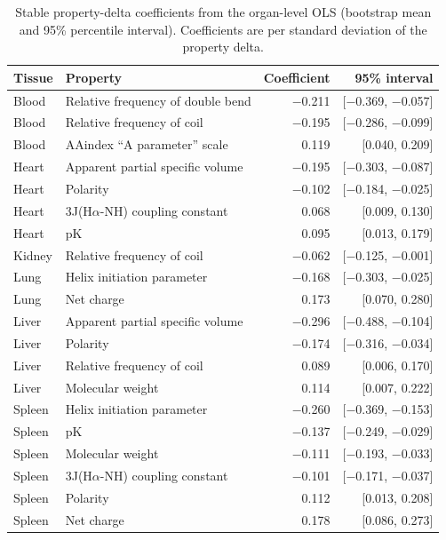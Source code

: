 \documentclass[11pt]{article}
\begin{document}
\begin{table}[H]
\centering
\caption{Stable property-delta coefficients from the organ-level OLS (bootstrap mean and 95\%
percentile interval). Coefficients are per standard deviation of the property delta.}
\label{tab:prop}
\small
\begin{tabular}{llrr}
\toprule
Tissue & Property & Coefficient & 95\% interval \\
\midrule
Blood & Relative frequency of double bend & $-$0.211 & [$-$0.369, $-$0.057] \\
Blood & Relative frequency of coil & $-$0.195 & [$-$0.286, $-$0.099] \\
Blood & AAindex ``A parameter'' scale & 0.119 & [0.040, 0.209] \\
Heart & Apparent partial specific volume & $-$0.195 & [$-$0.303, $-$0.087] \\
Heart & Polarity & $-$0.102 & [$-$0.184, $-$0.025] \\
Heart & 3J(H$\alpha$-NH) coupling constant & 0.068 & [0.009, 0.130] \\
Heart & pK & 0.095 & [0.013, 0.179] \\
Kidney & Relative frequency of coil & $-$0.062 & [$-$0.125, $-$0.001] \\
Lung & Helix initiation parameter & $-$0.168 & [$-$0.303, $-$0.025] \\
Lung & Net charge & 0.173 & [0.070, 0.280] \\
Liver & Apparent partial specific volume & $-$0.296 & [$-$0.488, $-$0.104] \\
Liver & Polarity & $-$0.174 & [$-$0.316, $-$0.034] \\
Liver & Relative frequency of coil & 0.089 & [0.006, 0.170] \\
Liver & Molecular weight & 0.114 & [0.007, 0.222] \\
Spleen & Helix initiation parameter & $-$0.260 & [$-$0.369, $-$0.153] \\
Spleen & pK & $-$0.137 & [$-$0.249, $-$0.029] \\
Spleen & Molecular weight & $-$0.111 & [$-$0.193, $-$0.033] \\
Spleen & 3J(H$\alpha$-NH) coupling constant & $-$0.101 & [$-$0.171, $-$0.037] \\
Spleen & Polarity & 0.112 & [0.013, 0.208] \\
Spleen & Net charge & 0.178 & [0.086, 0.273] \\
\bottomrule
\end{tabular}
\end{table}
\end{document}
